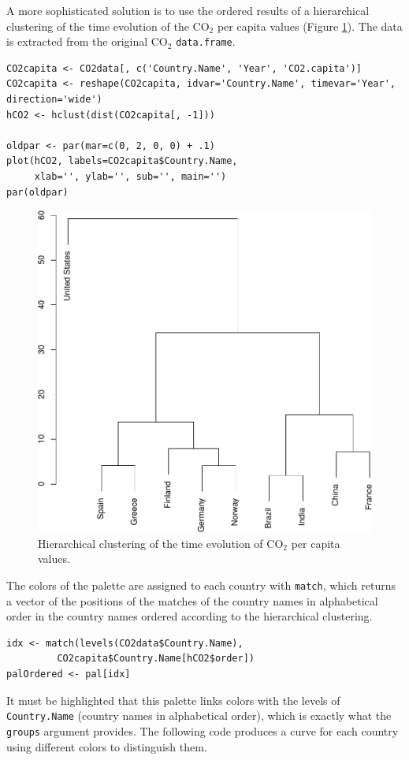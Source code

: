 A more sophisticated solution is to use the ordered results of a
hierarchical clustering of the time evolution of the $\mathrm{CO_2}$ per capita
values (Figure \ref{fig:hclustCO2}). The data is extracted from the
original $\mathrm{CO_2}$ \texttt{data.frame}.  


\lstset{language=R,numbers=none}
\begin{lstlisting}
CO2capita <- CO2data[, c('Country.Name', 'Year', 'CO2.capita')]
CO2capita <- reshape(CO2capita, idvar='Country.Name', timevar='Year', direction='wide')
hCO2 <- hclust(dist(CO2capita[, -1]))

oldpar <- par(mar=c(0, 2, 0, 0) + .1)
plot(hCO2, labels=CO2capita$Country.Name,
     xlab='', ylab='', sub='', main='')
par(oldpar)
\end{lstlisting}

\begin{figure}[htb]
\centering
\includegraphics[width=.9\linewidth]{figs/hclust.pdf}
\caption{\label{fig:hclustCO2}Hierarchical clustering of the time evolution of $\mathrm{CO_2}$ per capita values.}
\end{figure}


The colors of the palette are assigned to each country with \texttt{match},
which returns a vector of the positions of the matches of the country
names in alphabetical order in the country names ordered according to
the hierarchical clustering.
\lstset{language=R,numbers=none}
\begin{lstlisting}
idx <- match(levels(CO2data$Country.Name), 
	     CO2capita$Country.Name[hCO2$order])
palOrdered <- pal[idx]
\end{lstlisting}
It must be highlighted that this palette links colors with the levels
of \texttt{Country.Name} (country names in alphabetical order), which is
exactly what the \texttt{groups} argument provides. The following code
produces a curve for each country using different colors to
distinguish them.

